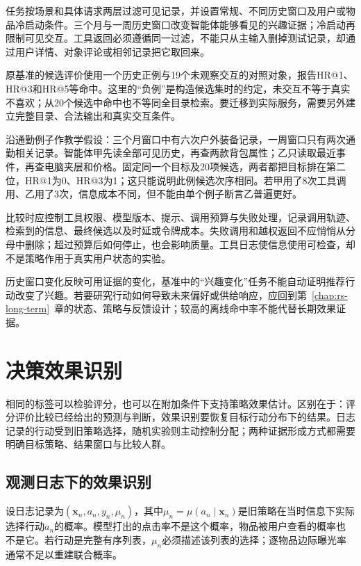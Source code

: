 任务按场景和具体请求两层过滤可见记录，并设置常规、不同历史窗口及用户或物品冷启动条件。三个月与一周历史窗口改变智能体能够看见的兴趣证据；冷启动再限制可见交互。工具返回必须遵循同一过滤，不能只从主输入删掉测试记录，却通过用户详情、对象评论或相邻记录把它取回来。

原基准的候选评价使用一个历史正例与19个未观察交互的对照对象，报告HR@1、HR@3和HR@5等命中。这里的“负例”是构造候选集时的约定，未交互不等于真实不喜欢；从20个候选中命中也不等同全目录检索。要迁移到实际服务，需要另外建立完整目录、合法输出和真实交互条件。

沿通勤例子作教学假设：三个月窗口中有六次户外装备记录，一周窗口只有两次通勤相关记录。智能体甲先读全部可见历史，再查两款背包属性；乙只读取最近事件，再查电脑夹层和价格。固定同一个目标及20项候选，两者都把目标排在第二位，HR@1为0、HR@3为1；这只能说明此例候选次序相同。若甲用了8次工具调用、乙用了3次，信息成本不同，但不能由单个例子断言乙普遍更好。

比较时应控制工具权限、模型版本、提示、调用预算与失败处理，记录调用轨迹、检索到的信息、最终候选以及时延或令牌成本。失败调用和越权返回不应悄悄从分母中删除；超过预算后如何停止，也会影响质量。工具日志使信息使用可检查，却不是策略作用于真实用户状态的实验。

历史窗口变化反映可用证据的变化，基准中的“兴趣变化”任务不能自动证明推荐行动改变了兴趣。若要研究行动如何导致未来偏好或供给响应，应回到第~\ref{chap:rs-long-term}~章的状态、策略与反馈设计；较高的离线命中率不能代替长期效果证据。

\section{决策效果识别}
\label{sec:rs-evaluation-effects}

相同的标签可以检验评分，也可以在附加条件下支持策略效果估计。区别在于：评分评价比较已经给出的预测与判断，效果识别要恢复目标行动分布下的结果。日志记录的行动受到旧策略选择，随机实验则主动控制分配；两种证据形成方式都需要明确目标策略、结果窗口与比较人群。

\subsection{观测日志下的效果识别}
\label{sec:rs-evaluation-logged}

设日志记录为$(\bm x_n,a_n,y_n,\mu_n)$，其中$\mu_n=\mu(a_n\mid\bm x_n)$是旧策略在当时信息下实际选择行动$a_n$的概率。模型打出的点击率不是这个概率，物品被用户查看的概率也不是它。若行动是完整有序列表，$\mu_n$必须描述该列表的选择；逐物品边际曝光率通常不足以重建联合概率。


